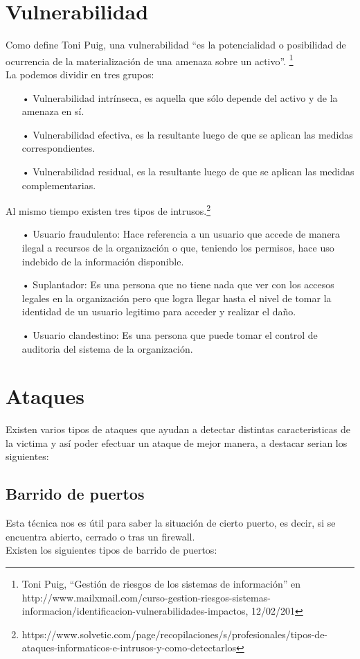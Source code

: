 \documentclass[11pt,a4paper]{article}
\begin{document}
\section{Vulnerabilidad}
Como define Toni Puig,  una  vulnerabilidad “es  la  potencialidad  o posibilidad  de  ocurrencia  de  la  materialización  de una  amenaza  sobre  un activo”. \footnote{ Toni Puig, “Gestión de riesgos de los sistemas de información” en http://www.mailxmail.com/curso-gestion-riesgos-sistemas-informacion/identificacion-vulnerabilidades-impactos, 12/02/201}\\
La podemos dividir en tres grupos:
\begin{itemize}
	\item[•] Vulnerabilidad intrínseca, es aquella que sólo depende del activo y de la amenaza en sí. 
	\item[•] Vulnerabilidad  efectiva, es la resultante luego de que se aplican las medidas correspondientes. 
	\item[•] Vulnerabilidad  residual, es la resultante luego de que se aplican las medidas complementarias.
\end{itemize}
Al mismo tiempo existen tres tipos de intrusos.\footnote{ https://www.solvetic.com/page/recopilaciones/s/profesionales/tipos-de-ataques-informaticos-e-intrusos-y-como-detectarlos}
\begin{itemize}
	\item[•] Usuario fraudulento: Hace referencia a un usuario que accede de manera ilegal a recursos de la organización o que, teniendo los permisos, hace uso indebido de la información disponible. 
	\item[•] Suplantador: Es una persona que no tiene nada que ver con los accesos legales en la organización pero que logra llegar hasta el nivel de tomar la identidad de un usuario legitimo para acceder y realizar el daño.
	\item[•] Usuario clandestino: Es una persona que puede tomar el control de auditoria del sistema de la organización.
\end{itemize}

\section{Ataques}
Existen varios tipos de ataques que ayudan a detectar distintas caracteristicas de la victima y así poder efectuar un ataque de mejor manera, a destacar serian los siguientes:
\subsection{Barrido de puertos}
Esta técnica nos es útil para saber la situación de cierto puerto, es decir, si se encuentra abierto, cerrado o tras un firewall.\\
Existen los siguientes tipos de barrido de puertos:
\end{document}
